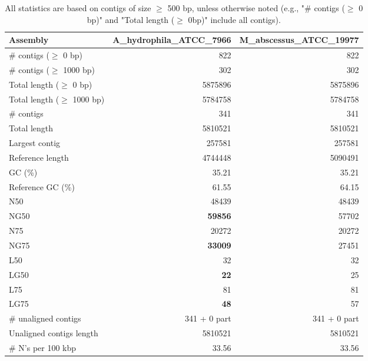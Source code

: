 \documentclass[12pt,a4paper]{article}
\begin{document}
\begin{table}[ht]
\begin{center}
\caption{All statistics are based on contigs of size $\geq$ 500 bp, unless otherwise noted (e.g., "\# contigs ($\geq$ 0 bp)" and "Total length ($\geq$ 0bp)" include all contigs).}
\begin{tabular}{|l*{2}{|r}|}
\hline
Assembly & A\_hydrophila\_ATCC\_7966 & M\_abscessus\_ATCC\_19977 \\ \hline
\# contigs ($\geq$ 0 bp) & 822 & 822 \\ \hline
\# contigs ($\geq$ 1000 bp) & 302 & 302 \\ \hline
Total length ($\geq$ 0 bp) & 5875896 & 5875896 \\ \hline
Total length ($\geq$ 1000 bp) & 5784758 & 5784758 \\ \hline
\# contigs & 341 & 341 \\ \hline
Total length & 5810521 & 5810521 \\ \hline
Largest contig & 257581 & 257581 \\ \hline
Reference length & 4744448 & 5090491 \\ \hline
GC (\%) & 35.21 & 35.21 \\ \hline
Reference GC (\%) & 61.55 & 64.15 \\ \hline
N50 & 48439 & 48439 \\ \hline
NG50 & {\bf 59856} & 57702 \\ \hline
N75 & 20272 & 20272 \\ \hline
NG75 & {\bf 33009} & 27451 \\ \hline
L50 & 32 & 32 \\ \hline
LG50 & {\bf 22} & 25 \\ \hline
L75 & 81 & 81 \\ \hline
LG75 & {\bf 48} & 57 \\ \hline
\# unaligned contigs & 341 + 0 part & 341 + 0 part \\ \hline
Unaligned contigs length & 5810521 & 5810521 \\ \hline
\# N's per 100 kbp & 33.56 & 33.56 \\ \hline
\end{tabular}
\end{center}
\end{table}
\end{document}
